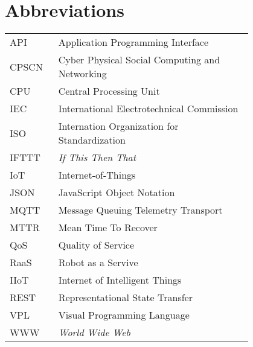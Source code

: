 \chapter*{Abbreviations}


\begin{flushleft}
\begin{tabular}{l p{0.8\linewidth}}
API      & Application Programming Interface\\
CPSCN    & Cyber Physical Social Computing and Networking\\
CPU      & Central Processing Unit\\
IEC      & International Electrotechnical Commission\\
ISO      & Internation Organization for Standardization\\
IFTTT    & \textit{If This Then That}\\
IoT      & Internet-of-Things\\
JSON     & JavaScript Object Notation\\
MQTT     & Message Queuing Telemetry Transport\\
MTTR     & Mean Time To Recover\\
QoS      & Quality of Service\\
RaaS     & Robot as a Servive\\
IIoT     & Internet of Intelligent Things\\
REST     & Representational State Transfer\\
VPL      & Visual Programming Language\\
WWW      & \textit{World Wide Web}\\
\end{tabular}
\end{flushleft}

